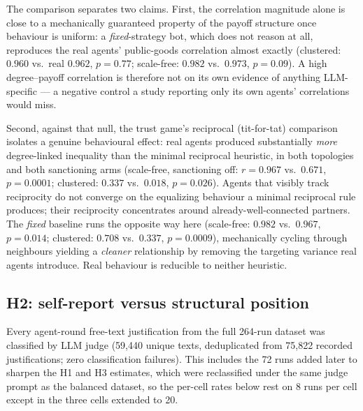 \documentclass[11pt,a4paper]{article}
\begin{document}
The comparison separates two claims. First, the correlation magnitude
alone is close to a mechanically guaranteed property of the payoff
structure once behaviour is uniform: a \emph{fixed}-strategy bot,
which does not reason at all, reproduces the real agents' public-goods
correlation almost exactly (clustered: $0.960$ vs.\ real $0.962$,
$p=0.77$; scale-free: $0.982$ vs.\ $0.973$, $p=0.09$). A high
degree--payoff correlation is therefore not on its own evidence of
anything LLM-specific --- a negative control a study reporting only
its own agents' correlations would miss.

Second, against that null, the trust game's reciprocal (tit-for-tat)
comparison isolates a genuine behavioural effect: real agents produced
substantially \emph{more} degree-linked inequality than the minimal
reciprocal heuristic, in both topologies and both sanctioning arms
(scale-free, sanctioning off: $r=0.967$ vs.\ $0.671$, $p=0.0001$;
clustered: $0.337$ vs.\ $0.018$, $p=0.026$). Agents that visibly track
reciprocity do not converge on the equalizing behaviour a minimal
reciprocal rule produces; their reciprocity concentrates around
already-well-connected partners. The \emph{fixed} baseline runs the
opposite way here (scale-free: $0.982$ vs.\ $0.967$, $p=0.014$;
clustered: $0.708$ vs.\ $0.337$, $p=0.0009$), mechanically cycling
through neighbours yielding a \emph{cleaner} relationship by removing
the targeting variance real agents introduce. Real behaviour is
reducible to neither heuristic.

\subsection{H2: self-report versus structural position}

Every agent-round free-text justification from the full 264-run
dataset was classified by LLM judge (59,440 unique texts,
deduplicated from 75,822 recorded justifications; zero classification
failures). This includes the 72 runs added later to sharpen the H1 and
H3 estimates, which were reclassified under the same judge prompt as
the balanced dataset, so the per-cell rates below rest on 8 runs per
cell except in the three cells extended to 20.
\end{document}
